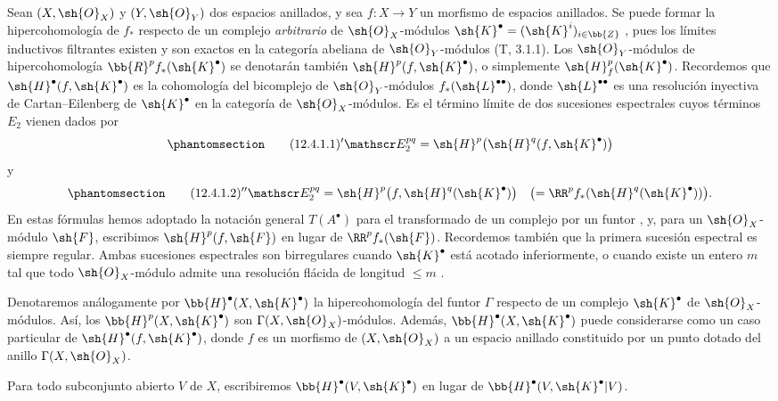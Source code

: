 \documentclass[oneside]{amsart}
\renewcommand*{\mathcal}{\mathscr}
\renewcommand{\leq}{\leqslant}
\newcommand{\oldpage}[2][]{{\marginnote{\normalfont\textbf{#1}~|~#2}}\ignorespaces}
\let\EGAOriginalLabel\label
\renewcommand{\label}[1]{\phantomsection\EGAOriginalLabel{#1}}
\begin{document}
\begin{env}[12.4.1]
\label{0.12.4.1}
Sean $(X,\sh{O}_X)$ y $(Y,\sh{O}_Y)$ dos espacios anillados, y sea
$f:X\longrightarrow Y$ un morfismo de espacios anillados.
Se puede formar la hipercohomología de $f_*$ respecto de un complejo
\emph{arbitrario} de $\sh{O}_X$-módulos
$\sh{K}^\bullet=(\sh{K}^i)_{i\in\bb{Z}}$
, pues los límites inductivos filtrantes existen y son exactos
en la categoría abeliana de $\sh{O}_Y$-módulos (T, 3.1.1).
Los $\sh{O}_Y$-módulos de hipercohomología
$\bb{R}^p f_*(\sh{K}^\bullet)$ se denotarán también
$\sh{H}^p(f,\sh{K}^\bullet)$, o simplemente
$\sh{H}^p_f(\sh{K}^\bullet)$.
Recordemos que $\sh{H}^\bullet(f,\sh{K}^\bullet)$ es la cohomología del
bicomplejo de $\sh{O}_Y$-módulos $f_*(\sh{L}^{\bullet\bullet})$,
donde $\sh{L}^{\bullet\bullet}$ es una resolución inyectiva de
Cartan--Eilenberg de $\sh{K}^\bullet$ en la categoría de
$\sh{O}_X$-módulos.
Es el término límite de dos sucesiones espectrales cuyos términos $E_2$
vienen dados por
\begin{equation}
\label{0.12.4.1.1}
\tag{12.4.1.1}
  {}'\mathcal E_2^{pq}
  =\sh{H}^p\bigl(\sh{H}^q(f,\sh{K}^\bullet)\bigr)
\end{equation}
y
\begin{equation}
\label{0.12.4.1.2}
\tag{12.4.1.2}
  {}''\mathcal E_2^{pq}
  =\sh{H}^p\bigl(f,\sh{H}^q(\sh{K}^\bullet)\bigr)
  \quad
  \bigl(=\RR^p f_*(\sh{H}^q(\sh{K}^\bullet))\bigr).
\end{equation}
En estas fórmulas hemos adoptado la notación general $T(A^\bullet)$
para el transformado de un complejo por un funtor , y, para
un $\sh{O}_X$-módulo $\sh{F}$, escribimos
$\sh{H}^p(f,\sh{F})$ en lugar de $\RR^p f_*(\sh{F})$.
Recordemos también que la primera sucesión espectral es siempre regular.
Ambas sucesiones espectrales son birregulares cuando $\sh{K}^\bullet$ está
acotado inferiormente,
\oldpage[0\textsubscript{III}]{63}
o cuando existe un entero $m$ tal que todo $\sh{O}_X$-módulo
admite una resolución flácida de longitud $\leq m$ .
\end{env}

\begin{env}[12.4.2]
\label{0.12.4.2}
Denotaremos análogamente por $\bb{H}^\bullet(X,\sh{K}^\bullet)$ la
hipercohomología del funtor $\Gamma$ respecto de un complejo
$\sh{K}^\bullet$ de $\sh{O}_X$-módulos.
Así, los $\bb{H}^p(X,\sh{K}^\bullet)$ son
$\Gamma(X,\sh{O}_X)$-módulos.
Además, $\bb{H}^\bullet(X,\sh{K}^\bullet)$ puede considerarse como un
caso particular de $\sh{H}^\bullet(f,\sh{K}^\bullet)$, donde $f$ es un
morfismo de $(X,\sh{O}_X)$ a un espacio anillado constituido por un punto
dotado del anillo $\Gamma(X,\sh{O}_X)$.

Para todo subconjunto abierto $V$ de $X$, escribiremos
$\bb{H}^\bullet(V,\sh{K}^\bullet)$ en lugar de
$\bb{H}^\bullet(V,\sh{K}^\bullet|V)$.
\end{env}
\end{document}
